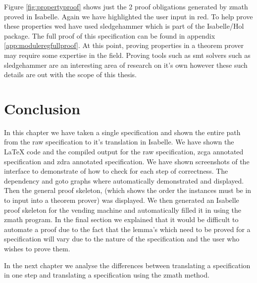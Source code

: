 Figure \ref{fig:propertyproof} shows just the 2 proof obligations generated by \gls{zmath} proved in Isabelle. Again we have highlighted the user input in {\color{red}red}. To help prove these properties wed have used sledgehammer \cite{sledgehammer} which is part of the Isabelle/Hol package. The full proof of this specification can be found in appendix \ref{app:moduleregfullproof}. At this point, proving properties in a theorem prover may require some expertise in the field. Proving tools such as \gls{smt} solvers \cite{DeMoura:2011:SMT:1995376.1995394} such as sledgehammer are an interesting area of research on it's own however these such details are out with the scope of this thesis.

\section{Conclusion}
In this chapter we have taken a single specification and shown the entire path from the raw specification to it's translation in Isabelle. We have shown the \LaTeX{} code and the compiled output for the raw specification, \gls{zcga} annotated specification and \gls{zdra} annotated specification. We have shown screenshots of the interface to demonstrate of how to check for each step of correctness. The dependency and goto graphs where automatically demonstrated and displayed. Then the general proof skeleton, (which shows the order the instances must be in to input into a theorem prover) was displayed. We then generated an Isabelle proof skeleton for the vending machine and automatically filled it in using the \gls{zmath} program. In the final section we explained that it would be difficult to automate a proof due to the fact that the lemma's which need to be proved for a specification will vary due to the nature of the specification and the user who wishes to prove them. 

In the next chapter we analyse the differences between translating a specification in one step and translating a specification using the \gls{zmath} method.
